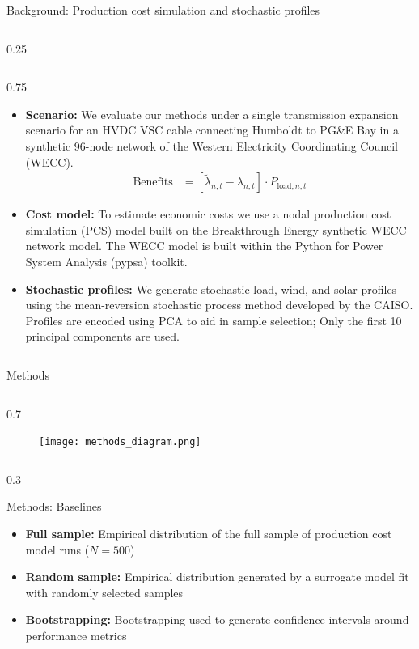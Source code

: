 \documentclass[final]{beamer}
\newlength{\colwidth}
\begin{document}
\begin{frame}[t]
\begin{columns}[t]
\begin{column}{\colwidth}
\begin{block}{Background: Production cost simulation and stochastic profiles}
\begin{column}{0.25\colwidth}
    \end{column}
    \begin{column}{0.75\colwidth}
      \vspace*{-10}
    \begin{itemize}
      \item \textbf{Scenario:} We evaluate our methods under a single transmission expansion scenario for an HVDC VSC cable connecting Humboldt to PG\&E Bay in a synthetic 96-node network of the Western Electricity Coordinating Council (WECC).
      \begin{align*}
        \text{Benefits} &=  [\tilde{\lambda}_{n,t} - \lambda_{n,t}] \cdot P_{\text{load},n,t}
      \end{align*}
      \item \textbf{Cost model:} To estimate economic costs we use a nodal production cost simulation (PCS) model built on the Breakthrough Energy synthetic WECC network model. The WECC model is built within the Python for Power System Analysis (pypsa) toolkit. 
      \item \textbf{Stochastic profiles:} We generate stochastic load, wind, and solar profiles using the mean-reversion stochastic process method developed by the CAISO. Profiles are encoded using PCA to aid in sample selection; Only the first 10 principal components are used.
    \end{itemize}
    \end{column}
  \end{block}

  \vspace*{-10}
  \begin{block}{Methods}
    \begin{column}{0.7\colwidth}
      \begin{figure}[h]
        \centering
        \texttt{[image: methods\_diagram.png]}
      \end{figure}
\end{column}
\begin{column}{0.3\colwidth}
  \vspace*{-20}
  \begin{block}{Methods: Baselines}
    \begin{itemize}
      \item \textbf{Full sample:} Empirical distribution of the full sample of production cost model runs ($N=500$)
      \item \textbf{Random sample:} Empirical distribution generated by a surrogate model fit with randomly selected samples
      \item \textbf{Bootstrapping:} Bootstrapping used to generate confidence intervals around performance metrics
    \end{itemize}
  \end{block}
\end{column}
\end{block}
  

\end{column}
\end{columns}
\end{frame}
\end{document}
